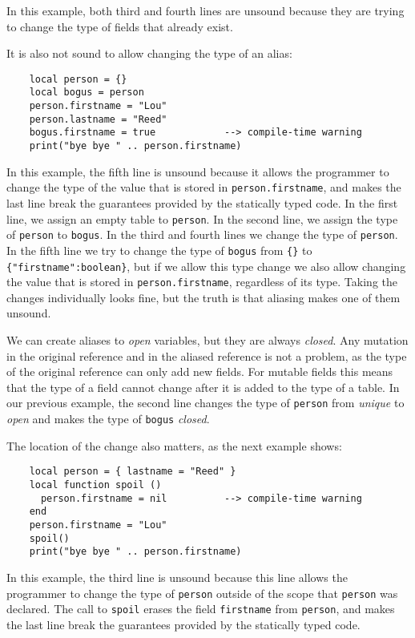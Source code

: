 In this example, both third and fourth lines are unsound because
they are trying to change the type of fields that already exist.

It is also not sound to allow changing the type of an alias:
\begin{verbatim}
    local person = {}
    local bogus = person
    person.firstname = "Lou"
    person.lastname = "Reed"
    bogus.firstname = true            --> compile-time warning
    print("bye bye " .. person.firstname)
\end{verbatim}

In this example, the fifth line is unsound because it allows the
programmer to change the type of the value that is stored in
\texttt{person.firstname}, and makes the last line break the
guarantees provided by the statically typed code.
In the first line, we assign an empty table to \texttt{person}.
In the second line, we assign the type of \texttt{person} to
\texttt{bogus}.
In the third and fourth lines we change the type of \texttt{person}.
In the fifth line we try to change the type of \texttt{bogus}
from \texttt{\{\}} to \texttt{\{"firstname":boolean\}},
but if we allow this type change we also allow changing the value
that is stored in \texttt{person.firstname}, regardless of its type.
Taking the changes individually looks fine, but the truth is that
aliasing makes one of them unsound.

We can create aliases to \emph{open} variables, but they are always \emph{closed}.
Any mutation in the original reference and in the aliased reference
is not a problem, as the type of the original reference can only
add new fields.
For mutable fields this means that the type of a field cannot
change after it is added to the type of a table.
In our previous example, the second line changes the type of
\texttt{person} from \emph{unique} to \emph{open} and makes the type of
\texttt{bogus} \emph{closed}.

The location of the change also matters, as the next example shows:
\begin{verbatim}
    local person = { lastname = "Reed" }
    local function spoil ()
      person.firstname = nil          --> compile-time warning
    end
    person.firstname = "Lou"
    spoil()
    print("bye bye " .. person.firstname)
\end{verbatim}

In this example, the third line is unsound because this line allows
the programmer to change the type of \texttt{person} outside of the
scope that \texttt{person} was declared.
The call to \texttt{spoil} erases the field \texttt{firstname} from
\texttt{person}, and makes the last line break the guarantees
provided by the statically typed code.

